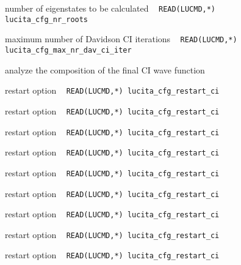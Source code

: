 \begin{description}
\item[] number of eigenstates to be calculated \verb| |\newline
\verb|READ(LUCMD,*) lucita_cfg_nr_roots |

\item[] maximum number of Davidson CI iterations \verb| |\newline
\verb|READ(LUCMD,*) lucita_cfg_max_nr_dav_ci_iter |

\item[] analyze the composition of the final CI wave function \newline

\item[] restart option \verb| |\newline
\verb|READ(LUCMD,*) lucita_cfg_restart_ci |

\item[] restart option \verb| |\newline
\verb|READ(LUCMD,*) lucita_cfg_restart_ci |

\item[] restart option \verb| |\newline
\verb|READ(LUCMD,*) lucita_cfg_restart_ci |

\item[] restart option \verb| |\newline
\verb|READ(LUCMD,*) lucita_cfg_restart_ci |

\item[] restart option \verb| |\newline
\verb|READ(LUCMD,*) lucita_cfg_restart_ci |

\item[] restart option \verb| |\newline
\verb|READ(LUCMD,*) lucita_cfg_restart_ci |

\item[] restart option \verb| |\newline
\verb|READ(LUCMD,*) lucita_cfg_restart_ci |

\item[] restart option \verb| |\newline
\verb|READ(LUCMD,*) lucita_cfg_restart_ci |

\item[] restart option \verb| |\newline
\verb|READ(LUCMD,*) lucita_cfg_restart_ci |


\end{description}
